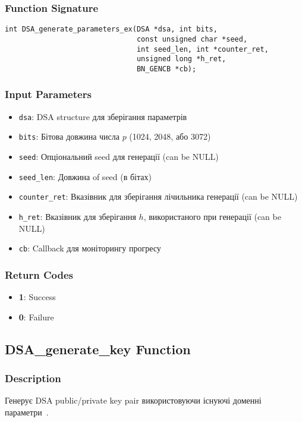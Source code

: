 \subsubsection{Function Signature}
\begin{verbatim}
int DSA_generate_parameters_ex(DSA *dsa, int bits,
                               const unsigned char *seed,
                               int seed_len, int *counter_ret,
                               unsigned long *h_ret,
                               BN_GENCB *cb);
\end{verbatim}

\subsubsection{Input Parameters}
\begin{itemize}
    \item \texttt{dsa}: DSA structure для зберігання параметрів
    \item \texttt{bits}: Бітова довжина числа $p$ (1024, 2048, або 3072)
    \item \texttt{seed}: Опціональний seed для генерації  (can be NULL)
    \item \texttt{seed\_len}: Довжина of seed (в бітах)
    \item \texttt{counter\_ret}: Вказівник для зберігання лічильника генерації (can be NULL)
    \item \texttt{h\_ret}: Вказівник для зберігання $h$, використаного при генерації (can be NULL)
    \item \texttt{cb}: Callback для моніторингу прогресу
\end{itemize}

\subsubsection{Return Codes}
\begin{itemize}
    \item \textbf{1}: Success
    \item \textbf{0}: Failure
\end{itemize}

\subsection{DSA\_generate\_key Function}

\subsubsection{Description}
Генерує DSA public/private key pair використовуючи існуючі доменні параметри~\cite{fips186}.

